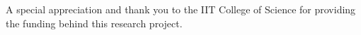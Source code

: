 \documentclass[final,mathserif]{beamer}
\newcommand{\black}[1]{{\color{black}#1}}
\begin{document}
\begin{frame}[fragile]
\begin{columns}[t]
\begin{column}{.31\linewidth}
\vspace{0.1in}

\begin{block}
{\footnotesize{\black{A special appreciation and thank you to the IIT College of Science for providing the funding behind this research project.}}}
\end{block}

\end{column}
\end{columns}

\end{frame}
\end{document}
